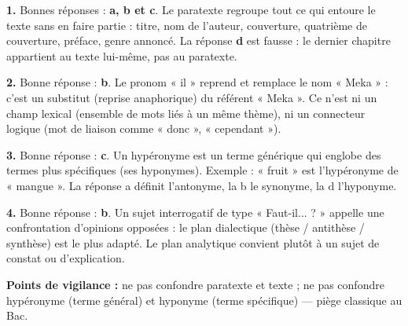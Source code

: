 \documentclass[11pt]{article}
\newcommand{\cle}[1]{{\popxbold\color{popdark}#1}}
\begin{document}
\begin{corrige}

\textbf{1.} Bonnes réponses : \textbf{a, b et c}. Le paratexte regroupe tout ce qui entoure le texte sans en faire partie : titre, nom de l'auteur, couverture, quatrième de couverture, préface, genre annoncé. La réponse \textbf{d} est fausse : le dernier chapitre appartient au texte lui-même, pas au paratexte.

\textbf{2.} Bonne réponse : \textbf{b}. Le pronom « il » reprend et remplace le nom « Meka » : c'est un \cle{substitut} (reprise anaphorique) du \cle{référent} « Meka ». Ce n'est ni un champ lexical (ensemble de mots liés à un même thème), ni un connecteur logique (mot de liaison comme « donc », « cependant »).

\textbf{3.} Bonne réponse : \textbf{c}. Un hypéronyme est un terme générique qui englobe des termes plus spécifiques (ses hyponymes). Exemple : « fruit » est l'hypéronyme de « mangue ». La réponse a définit l'antonyme, la b le synonyme, la d l'hyponyme.

\textbf{4.} Bonne réponse : \textbf{b}. Un sujet interrogatif de type « Faut-il... ? » appelle une confrontation d'opinions opposées : le plan \cle{dialectique} (thèse / antithèse / synthèse) est le plus adapté. Le plan analytique convient plutôt à un sujet de constat ou d'explication.

\textbf{Points de vigilance :} ne pas confondre paratexte et texte ; ne pas confondre hypéronyme (terme général) et hyponyme (terme spécifique) — piège classique au Bac.
\end{corrige}
\end{document}
